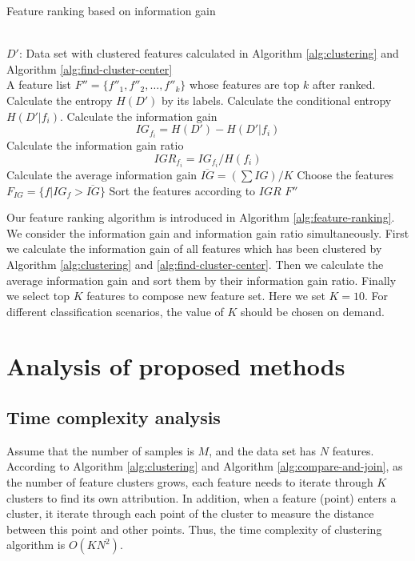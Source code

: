 \documentclass{ieeeaccess}
\theoremstyle{definition}
\begin{document}
\begin{algorithm}
    \caption{Feature ranking based on information gain}
    \label{alg:feature-ranking}
    \begin{algorithmic}[1]
        \REQUIRE ~~\\
            $D'$: Data set with clustered features calculated in Algorithm \ref{alg:clustering} and Algorithm \ref{alg:find-cluster-center}
        \ENSURE ~~\\
            A feature list $F''=\{f''_1, f''_2, \ldots, f''_k\}$ whose  features are top $k$ after ranked.
        \STATE Calculate the entropy $H(D')$ by its labels.
            \STATE Calculate the conditional entropy $H(D'|f_i)$.
            \STATE Calculate the information gain $$IG_{f_i} = H(D') - H(D'|f_i)$$
            \STATE Calculate the information gain ratio
            $$IGR_{f_i} = IG_{f_i}/H(f_i)$$
        \ENDFOR
        \STATE Calculate the average information gain $\overline{IG}=(\sum IG)/K$
        \STATE Choose the features $F_{IG}=\{f|IG_{f} > \overline{IG}\}$
        \STATE Sort the features according to $IGR$
        \RETURN $F''$
        \end{algorithmic}
\end{algorithm}

Our feature ranking algorithm is introduced in Algorithm \ref{alg:feature-ranking}. We consider the information gain and information gain ratio simultaneously. First we calculate the information gain of all features which has been clustered by Algorithm \ref{alg:clustering} and \ref{alg:find-cluster-center}. Then we calculate the average information gain and sort them by their information gain ratio. Finally we select top $K$ features to compose new feature set. Here we set $K=10$. For different classification scenarios, the value of $K$ should be chosen on demand.

\section{Analysis of proposed methods}
\label{sec:analysis}

\subsection{Time complexity analysis}

Assume that the number of samples is $M$, and the data set has $N$ features. According to Algorithm \ref{alg:clustering} and Algorithm \ref{alg:compare-and-join}, as the number of feature clusters grows, each feature needs to iterate through $K$ clusters to find its own attribution. In addition, when a feature (point) enters a cluster, it iterate through each point of the cluster to measure the distance between this point and other points. Thus, the time complexity of clustering algorithm is $O(KN^2)$. 
\end{document}
